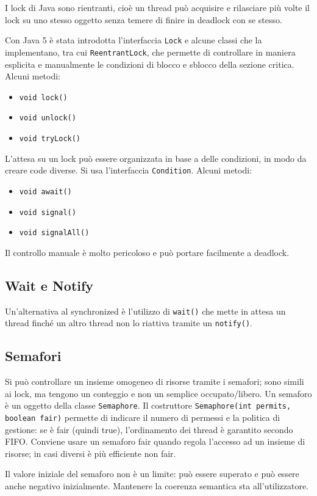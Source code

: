 I lock di Java sono rientranti, cioè un thread può acquisire e rilasciare più volte il lock su uno stesso oggetto senza temere di finire in deadlock con se stesso.

Con Java 5 è stata introdotta l'interfaccia \texttt{Lock} e alcune classi che la implementano, tra cui \texttt{ReentrantLock}, che permette di controllare in maniera esplicita e manualmente le condizioni di blocco e sblocco della sezione critica. Alcuni metodi: 
\begin{itemize}
\item \texttt{void lock()}
\item \texttt{void unlock()}
\item \texttt{void tryLock()} 
\end{itemize}
L'attesa su un lock può essere organizzata in base a delle condizioni, in modo da creare code diverse. Si usa l'interfaccia \texttt{Condition}. Alcuni metodi: 
\begin{itemize}
\item \texttt{void await()}
\item \texttt{void signal()}
\item \texttt{void signalAll()} 
\end{itemize}
Il controllo manuale è molto pericoloso e può portare facilmente a deadlock.
\subsection{Wait e Notify}
Un'alternativa al synchronized è l'utilizzo di \texttt{wait()} che mette in attesa un thread finché un altro thread non lo riattiva tramite un \texttt{notify()}. 

\subsection{Semafori}
Si può controllare un insieme omogeneo di risorse tramite i semafori; sono simili ai lock, ma tengono un conteggio e non un semplice occupato/libero. Un semaforo è un oggetto della classe \texttt{Semaphore}. Il costruttore \texttt{Semaphore(int permits, boolean fair)} permette di indicare il numero di permessi e la politica di gestione: se è fair (quindi true), l'ordinamento dei thread è garantito secondo FIFO. Conviene usare un semaforo fair quando regola l'accesso ad un insieme di risorse; in casi diversi è più efficiente non fair.

Il valore iniziale del semaforo non \`e un limite: può essere superato e pu\`o essere anche negativo inizialmente. Mantenere la coerenza semantica sta all'utilizzatore.


